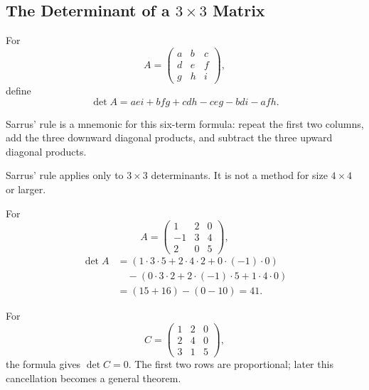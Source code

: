 \subsection{The Determinant of a $3\times3$ Matrix}

\begin{definitionbox}
For
\[
A=\begin{pmatrix}
a&b&c\\d&e&f\\g&h&i
\end{pmatrix},
\]
define
\[
\boxed{\det A=aei+bfg+cdh-ceg-bdi-afh}.
\]
\end{definitionbox}

Sarrus' rule is a mnemonic for this six-term formula: repeat the first two columns, add the three downward diagonal products, and subtract the three upward diagonal products.

\begin{remarkbox}
Sarrus' rule applies only to $3\times3$ determinants. It is not a method for size $4\times4$ or larger.
\end{remarkbox}

\begin{examplebox}
For
\[
A=\begin{pmatrix}
1&2&0\\-1&3&4\\2&0&5
\end{pmatrix},
\]
\begin{align*}
\det A
&=(1\cdot3\cdot5+2\cdot4\cdot2+0\cdot(-1)\cdot0)\\
&\quad-(0\cdot3\cdot2+2\cdot(-1)\cdot5+1\cdot4\cdot0)\\
&=(15+16)-(0-10)=41.
\end{align*}
\end{examplebox}

\begin{examplebox}
For
\[
C=\begin{pmatrix}
1&2&0\\2&4&0\\3&1&5
\end{pmatrix},
\]
the formula gives $\det C=0$. The first two rows are proportional; later this cancellation becomes a general theorem.
\end{examplebox}
